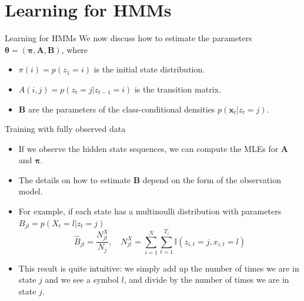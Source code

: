 \documentclass[10pt,mathserif]{beamer}
\begin{document}
\section{Learning for HMMs}
\begin{frame}{Learning for HMMs}
We now discuss how to estimate the parameters $ \bm{\theta}= (\bm{\pi},\bm{A},\bm{B})$, where
\begin{itemize}
    \item $\pi(i) = p(z_1 = i)$ is the initial state distribution.
    \item $A(i,j) = p(z_t = j|z_{t-1} = i)$ is the transition matrix.
    \item $\bm{B}$ are the parameters of the class-conditional densities $p(\bm{x}_t|z_t = j)$.
\end{itemize}
\end{frame}

\begin{frame}{Training with fully observed data}
\begin{itemize}
    \item If we observe the hidden state sequences, we can compute the MLEs for $\bm{A}$ and $\bm{\pi}$.
    \item The details on how to estimate $\bm{B}$ depend on the form of the observation model.
    \item  For example, if each state has a multinoulli distribution with parameters $B_{jl} = p(X_t = l|z_t = j)$
    \begin{equation*}
        \hat{B}_{jl} = \frac{N_{jl}^X}{N_j}, \quad N_{jl}^X = \sum_{i=1}^N \sum_{t=1}^{T_i}\mathbb{I}(z_{i,t} = j, x_{i,t} = l)
    \end{equation*}
    \item This result is quite intuitive: we simply add up the number of times we are in state $j$ and we see a symbol $l$, and divide by the number of times we are in state $j$.
\end{itemize}
\end{frame}
\end{document}
